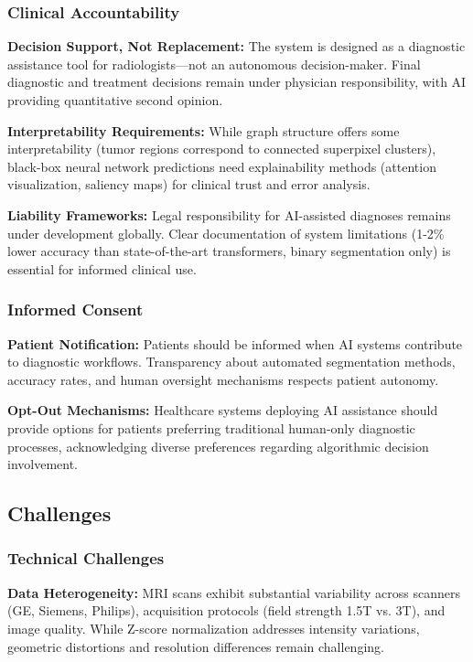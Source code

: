\subsubsection{Clinical Accountability}

\textbf{Decision Support, Not Replacement:} The system is designed as a diagnostic assistance tool for radiologists—not an autonomous decision-maker. Final diagnostic and treatment decisions remain under physician responsibility, with AI providing quantitative second opinion.

\textbf{Interpretability Requirements:} While graph structure offers some interpretability (tumor regions correspond to connected superpixel clusters), black-box neural network predictions need explainability methods (attention visualization, saliency maps) for clinical trust and error analysis.

\textbf{Liability Frameworks:} Legal responsibility for AI-assisted diagnoses remains under development globally. Clear documentation of system limitations (1-2\% lower accuracy than state-of-the-art transformers, binary segmentation only) is essential for informed clinical use.

\subsubsection{Informed Consent}

\textbf{Patient Notification:} Patients should be informed when AI systems contribute to diagnostic workflows. Transparency about automated segmentation methods, accuracy rates, and human oversight mechanisms respects patient autonomy.

\textbf{Opt-Out Mechanisms:} Healthcare systems deploying AI assistance should provide options for patients preferring traditional human-only diagnostic processes, acknowledging diverse preferences regarding algorithmic decision involvement.


\subsection{Challenges}

\subsubsection{Technical Challenges}

\textbf{Data Heterogeneity:} MRI scans exhibit substantial variability across scanners (GE, Siemens, Philips), acquisition protocols (field strength 1.5T vs. 3T), and image quality. While Z-score normalization addresses intensity variations, geometric distortions and resolution differences remain challenging.

